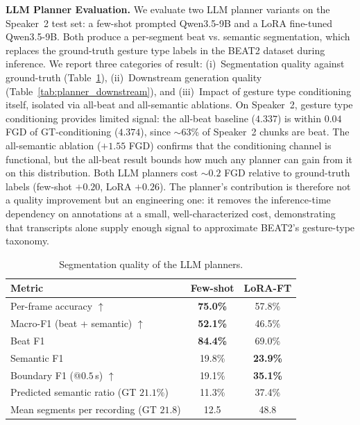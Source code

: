 \noindent \textbf{LLM Planner Evaluation.}
\label{sec:planner_eval}
We evaluate two LLM planner variants on the Speaker~2 test set: a few-shot prompted Qwen3.5-9B and a LoRA fine-tuned
Qwen3.5-9B.
Both produce a per-segment beat vs. semantic segmentation, which replaces the ground-truth gesture type labels in the BEAT2 dataset during inference.
We report three categories of result:
(i)~Segmentation quality against ground-truth (Table~\ref{tab:planner_quality}),
(ii)~Downstream generation quality (Table~\ref{tab:planner_downstream}), and
(iii)~Impact of gesture type conditioning itself, isolated via all-beat and all-semantic ablations.
On Speaker~2, gesture type conditioning provides limited signal: the all-beat baseline ($4.337$) is within $0.04$ FGD of GT-conditioning ($4.374$), since $\sim$63\% of Speaker~2 chunks are beat.
The all-semantic ablation ($+1.55$ FGD) confirms that the conditioning channel is functional, but the all-beat result bounds how much any planner can gain from it on this distribution.
Both LLM planners cost $\sim$$0.2$ FGD relative to ground-truth labels (few-shot $+0.20$, LoRA $+0.26$).
The planner's contribution is therefore not a quality improvement but an engineering one: it removes the inference-time dependency on annotations at a small, well-characterized cost, demonstrating that transcripts alone supply enough signal to approximate BEAT2's gesture-type taxonomy.

\begin{table}[t]
\scriptsize
\caption{Segmentation quality of the LLM planners.}%
\label{tab:planner_quality}
\begin{tabular}{lcc}
\toprule
\textbf{Metric} & \textbf{Few-shot} & \textbf{LoRA-FT} \\
\midrule
Per-frame accuracy $\uparrow$ & \textbf{75.0\%} & 57.8\% \\
Macro-F1 (beat + semantic) $\uparrow$ & \textbf{52.1\%} & 46.5\% \\
\quad Beat F1                 & \textbf{84.4\%} & 69.0\% \\
\quad Semantic F1             & 19.8\%          & \textbf{23.9\%} \\
Boundary F1 (@$0.5$\,s) $\uparrow$ & 19.1\% & \textbf{35.1\%} \\
\midrule
Predicted semantic ratio (GT $21.1\%$) & 11.3\% & 37.4\% \\
Mean segments per recording (GT $21.8$) & 12.5 & 48.8 \\
\bottomrule
\end{tabular}
\end{table}


